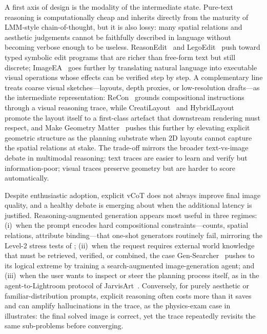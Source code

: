 A first axis of design is the modality of the intermediate state. Pure-text reasoning is computationally cheap and inherits directly from the maturity of LMM-style chain-of-thought, but it is also lossy: many spatial relations and aesthetic judgements cannot be faithfully described in language without becoming verbose enough to be useless. ReasonEdit~\citep{Yin2025ReasonEditTR} and LegoEdit~\citep{Jia2025LegoEditAG} push toward typed symbolic edit programs that are richer than free-form text but still discrete; ImageEA~\citep{Hu2025ImageEA} goes further by translating natural language into executable visual operations whose effects can be verified step by step. A complementary line treats coarse visual sketches---layouts, depth proxies, or low-resolution drafts---as the intermediate representation: ReCon~\citep{ReCon} grounds compositional instructions through a visual reasoning trace, while CreatiLayout~\citep{CreatiLayout} and HybridLayout~\citep{wu2025hybrid} promote the layout itself to a first-class artefact that downstream rendering must respect, and Make Geometry Matter~\citep{zhang2026make} pushes this further by elevating explicit geometric structure as the planning substrate when 2D layouts cannot capture the spatial relations at stake. The trade-off mirrors the broader text-vs-image debate in multimodal reasoning: text traces are easier to learn and verify but information-poor; visual traces preserve geometry but are harder to score automatically.

Despite enthusiastic adoption, explicit vCoT does not always improve final image quality, and a healthy debate is emerging about when the additional latency is justified. Reasoning-augmented generation appears most useful in three regimes: (i)~when the prompt encodes hard compositional constraints---counts, spatial relations, attribute binding---that one-shot generators routinely fail, mirroring the Level-2 stress tests of ; (ii)~when the request requires external world knowledge that must be retrieved, verified, or combined, the case Gen-Searcher~\citep{feng2026gen} pushes to its logical extreme by training a search-augmented image-generation agent; and (iii)~when the user wants to inspect or steer the planning process itself, as in the agent-to-Lightroom protocol of JarvisArt~\citep{lin2025jarvisart}. Conversely, for purely aesthetic or familiar-distribution prompts, explicit reasoning often costs more than it saves and can amplify hallucinations in the trace, as the physics-exam case in  illustrates: the final solved image is correct, yet the trace repeatedly revisits the same sub-problems before converging.

